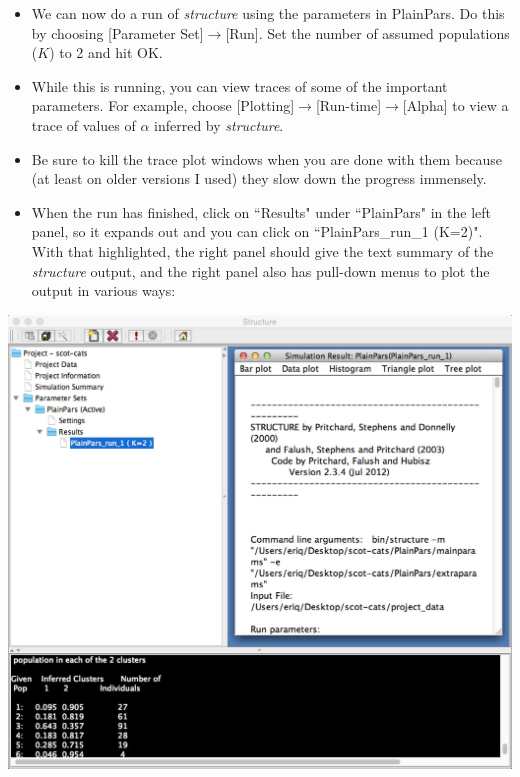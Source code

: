 \begin{itemize}
\item We can now do a run of {\em structure} using the parameters in PlainPars.  Do this by choosing [Parameter Set]$\rightarrow$[Run]. Set the number of assumed populations ($K$) to 2 and hit OK.
\item While this is running, you can view traces of some of the important parameters.  For example, choose [Plotting]$\rightarrow$[Run-time]$\rightarrow$[Alpha] to view a trace of values of $\alpha$ inferred by {\em structure}.  
\item Be sure to kill the trace plot windows when you are done with them because (at least on older versions I used) they slow down the progress immensely.  
\item When the run has finished, click on ``Results" under ``PlainPars" in the left panel, so it expands out and you can click on ``PlainPars\_run\_1 (K=2)".  With that highlighted, the right panel should give the text summary of the {\em structure} output, and the right panel also has pull-down menus to plot the output in various ways:
\end{itemize}
\begin{center}
\includegraphics[width=.66\textwidth]{illus/Run1.jpg}
\end{center}


